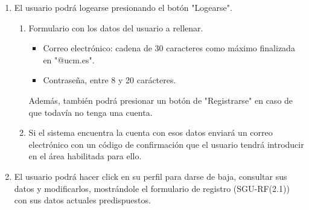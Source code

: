 \documentclass{article}
\begin{document}
\begin{enumerate}[label=\textbf{SGU-RF(\arabic*)}, labelwidth=25mm, labelsep=2mm, itemindent=0mm, leftmargin=*, align=parleft]
            \item El usuario podrá logearse presionando el botón "Logearse". 
            \begin{adjustwidth}{15mm}{0mm}
                \begin{enumerate}[label=\textbf{SGU-RF(3.\arabic*)}]
                    \item Formulario con los datos del usuario a rellenar.
                        \begin{itemize}
                            \item Correo electrónico: cadena de 30 caracteres como máximo finalizada en "@ucm.es".
                            \item Contraseña, entre 8 y 20 carácteres.
                        \end{itemize}
                        Además, también podrá presionar un botón de "Registrarse" en caso de que todavía no tenga una cuenta.
                    \item Si el sistema encuentra la cuenta con esos datos enviará un correo electrónico con un código de confirmación que el usuario tendrá introducir en el área habilitada para ello.
                \end{enumerate}
            \end{adjustwidth}

            \item El usuario podrá hacer click en su perfil para darse de baja, consultar sus datos y modificarlos, mostrándole el formulario de registro (SGU-RF(2.1)) con sus datos actuales predispuestos.


\end{enumerate}
\end{document}

